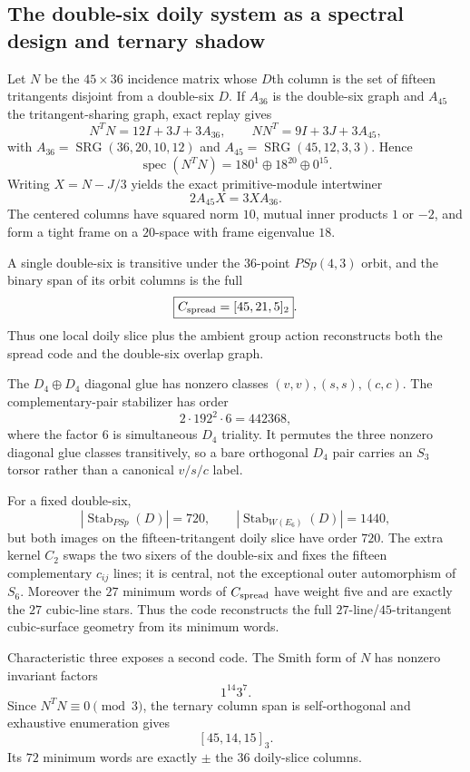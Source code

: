 \subsection{The double-six doily system as a spectral design and ternary shadow}
Let $N$ be the $45\times36$ incidence matrix whose $D$th column is the set of fifteen tritangents disjoint from a double-six $D$.  If $A_{36}$ is the double-six graph and $A_{45}$ the tritangent-sharing graph, exact replay gives
\[
N^TN=12I+3J+3A_{36},\qquad NN^T=9I+3J+3A_{45},
\]
with $A_{36}=\operatorname{SRG}(36,20,10,12)$ and $A_{45}=\operatorname{SRG}(45,12,3,3)$.  Hence
\[
\operatorname{spec}(N^TN)=180^1\oplus18^{20}\oplus0^{15}.
\]
Writing $X=N-J/3$ yields the exact primitive-module intertwiner
\[
\boxed{2A_{45}X=3XA_{36}}.
\]
The centered columns have squared norm $10$, mutual inner products $1$ or $-2$, and form a tight frame on a $20$-space with frame eigenvalue $18$.

A single double-six is transitive under the $36$-point $PSp(4,3)$ orbit, and the binary span of its orbit columns is the full
\[
\boxed{C_{\rm spread}=[45,21,5]_2}.
\]
Thus one local doily slice plus the ambient group action reconstructs both the spread code and the double-six overlap graph.

The $D_4\oplus D_4$ diagonal glue has nonzero classes $(v,v),(s,s),(c,c)$.  The complementary-pair stabilizer has order
\[
2\cdot192^2\cdot6=442368,
\]
where the factor $6$ is simultaneous $D_4$ triality.  It permutes the three nonzero diagonal glue classes transitively, so a bare orthogonal $D_4$ pair carries an $S_3$ torsor rather than a canonical $v/s/c$ label.

For a fixed double-six,
\[
|\operatorname{Stab}_{PSp}(D)|=720,\qquad |\operatorname{Stab}_{W(E_6)}(D)|=1440,
\]
but both images on the fifteen-tritangent doily slice have order $720$.  The extra kernel $C_2$ swaps the two sixers of the double-six and fixes the fifteen complementary $c_{ij}$ lines; it is central, not the exceptional outer automorphism of $S_6$.  Moreover the $27$ minimum words of $C_{\rm spread}$ have weight five and are exactly the $27$ cubic-line stars.  Thus the code reconstructs the full $27$-line/$45$-tritangent cubic-surface geometry from its minimum words.

Characteristic three exposes a second code.  The Smith form of $N$ has nonzero invariant factors
\[
\boxed{1^{14}3^7}.
\]
Since $N^TN\equiv0\pmod3$, the ternary column span is self-orthogonal and exhaustive enumeration gives
\[
\boxed{[45,14,15]_3}.
\]
Its $72$ minimum words are exactly $\pm$ the $36$ doily-slice columns.


